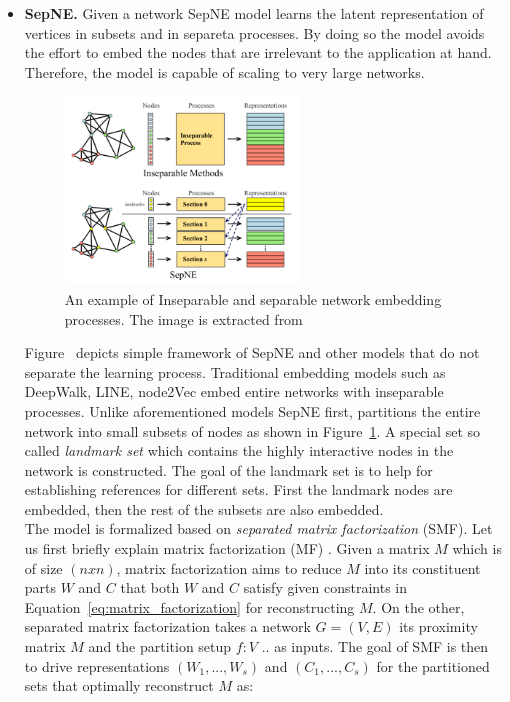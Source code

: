 \begin{itemize}
\item \textbf{SepNE.}
Given a network SepNE model learns the latent representation of vertices in subsets and in separeta processes. By doing so the model avoids the effort to embed the nodes that are irrelevant to the application at hand. Therefore, the model is capable of scaling to very large networks.\\
\begin{figure}[h]
\centering
 \includegraphics[height=5cm]{Figures/fig_SepNE.png}
 \caption{An example of Inseparable and separable network embedding processes. The image is extracted from~\protect\cite{SepNE}}
 \label{fig:SepNE}
\end{figure} 
Figure~\cite{SepNE} depicts simple framework of SepNE and other models that do not separate the learning process. Traditional embedding models such as DeepWalk, LINE, node2Vec embed entire networks with inseparable processes. Unlike aforementioned models SepNE first, partitions the entire network into small subsets of nodes as shown in Figure~\ref{fig:SepNE}. A special set so called \textit{landmark set} which contains the highly interactive nodes in the network is constructed. The goal of the landmark set is to help for establishing references for different sets. First the landmark nodes are embedded, then the rest of the subsets are also embedded.\\
The model is formalized based on \textit{separated matrix factorization} (SMF). Let us first briefly explain matrix factorization (MF) . Given a matrix $M$ which is of size $(nxn)$, matrix factorization aims to reduce $M$ into its constituent parts $W$ and $C$ that both $W$ and $C$ satisfy given constraints in Equation~\ref{eq:matrix_factorization} for reconstructing $M$. On the other, separated matrix factorization takes a network $G=(V,E)$ its proximity matrix $M$ and the partition setup $f : V $ .. as inputs. The goal of SMF is then to drive representations $(W_1, ..., W_s)$ and $(C_1, ..., C_s)$ for the partitioned sets that optimally reconstruct $M$ as: \\

\end{itemize}
